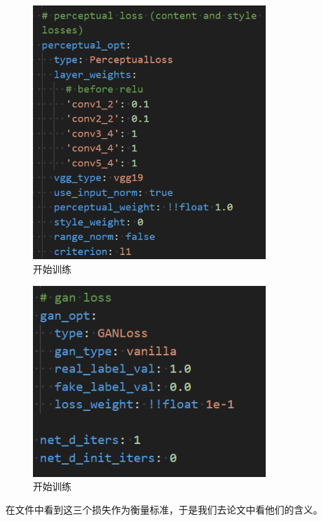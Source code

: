 \documentclass[UTF8,openany]{ctexbook}
\begin{document}
\begin{figure}[H]
  \centering
  \includegraphics[width=0.8\textwidth]{img/13.png}
  \caption{开始训练}
\end{figure}

\begin{figure}[H]
  \centering
  \includegraphics[width=0.8\textwidth]{img/14.png}
  \caption{开始训练}
\end{figure}

在文件中看到这三个损失作为衡量标准，于是我们去论文中看他们的含义。
\end{document}
